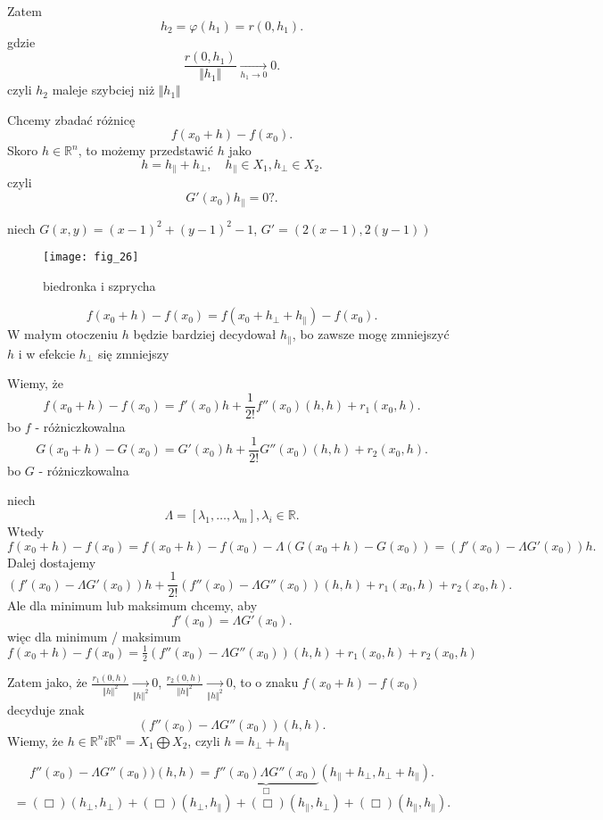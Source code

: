 \documentclass[../main.tex]{subfiles}
\begin{document}
Zatem
\[
    h_2 = \varphi(h_1) = r(0,h_1)
.\] gdzie \[
\frac{r(0,h_1)}{\Vert h_1 \Vert} \underset{h_1 \to 0}{\to} 0
.\]
czyli $h_2$ maleje szybciej niż $\Vert h_1 \Vert$

Chcemy zbadać różnicę \[
    f(x_0+h) - f(x_0)
.\] Skoro $h\in \mathbb{R}^n$, to możemy przedstawić $h$ jako \[
h = h_{\parallel} + h_{\perp},\quad h_{\parallel} \in X_1, h_{\perp} \in X_2
.\]
czyli \[
    G'(x_0)h_{\parallel} = 0?
.\]

\begin{przyklad}
    niech $G(x,y) = (x-1)^2 + (y-1)^2 - 1$,  $G' = (2(x-1),2(y-1))$
    \begin{figure}[h]
        \centering
        \texttt{[image: fig\_26]}
        \caption{biedronka i szprycha}
        \label{fig:fig_26}
    \end{figure}
\end{przyklad}

\[
    f(x_0+h) - f(x_0) = f(x_0 + h_\perp + h_\parallel) - f(x_0)
.\]
W małym otoczeniu $h$ będzie bardziej decydował $h_\parallel$, bo zawsze mogę zmniejszyć $h$ i w efekcie $h_\perp$ się zmniejszy

Wiemy, że
\[
    f(x_0+h) - f(x_0) = f'(x_0) h + \frac{1}{2!} f''(x_0)(h,h) + r_1(x_0,h)
.\] bo $f$ - różniczkowalna
\[
    G(x_0+h) - G(x_0) = G'(x_0)h + \frac{1}{2!} G''(x_0)(h, h) + r_2(x_0,h)
.\] bo $G$ - różniczkowalna

niech \[
    \Lambda = \left[ \lambda_1,\ldots,\lambda_m \right] , \lambda_i \in \mathbb{R}
.\]
Wtedy \[
    f(x_0+h) - f(x_0) = f(x_0 + h) - f(x_0) - \Lambda (G (x_0+h) - G(x_0)) = (f'(x_0) - \Lambda G'(x_0)) h
.\]
Dalej dostajemy \[
    (f'(x_0) - \Lambda G'(x_0))h + \frac{1}{2!} (f''(x_0) - \Lambda G''(x_0))(h, h) + r_1(x_0,h) + r_2 (x_0,h)
.\]
Ale dla minimum lub maksimum chcemy, aby \[
    f'(x_0) = \Lambda G'(x_0)
.\]
więc dla minimum / maksimum $f(x_0+h) - f(x_0) = \frac{1}{2} (f''(x_0) - \Lambda G''(x_0))(h,h) + r_1(x_0,h)+r_2(x_0,h)$

Zatem jako, że $\frac{r_1(0,h)}{\Vert h \Vert ^2} \underset{\Vert h \Vert^2}{\to}  0$, $\frac{r_2(0,h)}{\Vert h \Vert ^2} \underset{\Vert h \Vert ^2}{\to} 0$, to o znaku $f(x_0+h) - f(x_0)$ decyduje znak \[
    (f''(x_0) - \Lambda G''(x_0))(h,h)
.\]
Wiemy, że $h\in \mathbb{R}^{n} i \mathbb{R}^n = X_1 \bigoplus X_2$, czyli $ h = h_\perp + h_\parallel$

 \[
     f''(x_0) - \Lambda G''(x_0))(h,h) = \underbrace{f''(x_0) \Lambda G''(x_0)}_{\Box} (h_\parallel + h_\perp, h_\perp + h_\parallel)
.\]
\[
 = (\Box)(h_\perp, h_\perp) + (\Box)(h_\perp, h_\parallel) + (\Box)(h_\parallel, h_\perp) + (\Box)(h_\parallel, h_\parallel)
.\]
\end{document}
